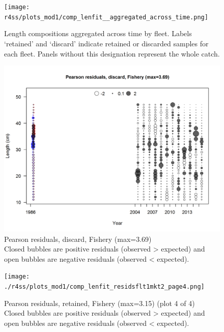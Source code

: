\documentclass[12pt,]{article}
\begin{document}
\begin{figure}
\centering
\texttt{[image: r4ss/plots\_mod1/comp\_lenfit\_\_aggregated\_across\_time.png]}
\caption{Length compositions aggregated across time by fleet. Labels
`retained' and `discard' indicate retained or discarded samples for each
fleet. Panels without this designation represent the whole catch.
\label{fig:length_agg}}
\end{figure}

\begin{figure}
\centering
\includegraphics{./r4ss/plots_mod1/comp_lenfit_residsflt1mkt1.png}
\caption{Pearson residuals, discard, Fishery (max=3.69)\\
Closed bubbles are positive residuals (observed \textgreater{} expected)
and open bubbles are negative residuals (observed \textless{} expected).
\label{fig:discard_len_pearson}}
\end{figure}

\begin{figure}
\centering
\texttt{[image: ./r4ss/plots\_mod1/comp\_lenfit\_residsflt1mkt2\_page4.png]}
\caption{Pearson residuals, retained, Fishery (max=3.15) (plot 4 of 4)\\
Closed bubbles are positive residuals (observed \textgreater{} expected)
and open bubbles are negative residuals (observed \textless{} expected).
\label{fig:fishery_len_pearson}}
\end{figure}
\end{document}
